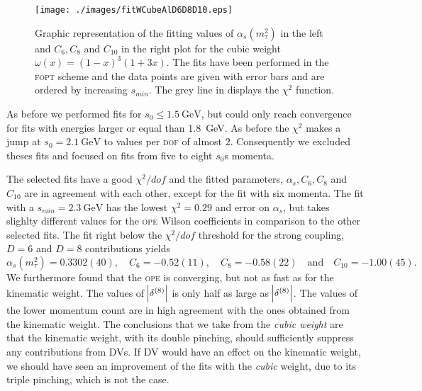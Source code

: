 \documentclass[../../index.tex]{subfiles}
\begin{document}
\begin{figure}
  \centering \texttt{[image: ./images/fitWCubeAlD6D8D10.eps]}
  \caption{Graphic representation of the fitting values of
    \(\alpha_s(m_\tau^2)\) in the left and \(C_6, C_8\) and \(C_{10}\) in the
    right plot for the cubic weight \(\omega(x)=(1-x)^3(1+3x)\). The fits have
    been performed in the \textsc{fopt} scheme and the data points are given
    with error bars and are ordered by increasing \(s_{min}\). The grey line in
    displays the \(\chi^2\) function.}
  \label{fig:fitWCubeAlpha}
\end{figure}

As before we performed fits for \(s_0 \leq \SI{1.5}{\giga\eV}\), but could only
reach convergence for fits with energies larger or equal than
\SI{1.8}{\giga\eV}. As before the \(\chi^2\) makes a jump at
\(s_0=\SI{2.1}{\giga\eV}\) to values per \textsc{dof} of almost \(2\).
Consequently we excluded theses fits and focused on fits from five to eight
\(s_0\)s momenta.

The selected fits have a good \(\chi^2/dof\) and the fitted parameters,
\(\alpha_s, C_6, C_8\) and \(C_{10}\) are in agreement with each other, except
for the fit with six momenta. The fit with a \(s_{min}=\SI{2.3}{\giga\eV}\) has
the lowest \(\chi^2=0.29\) and error on \(\alpha_s\), but takes slighlty
different values for the \textsc{ope} Wilson coefficients in comparison to the
other selected fits. The fit right below the \(\chi^2/dof\) threshold for the
strong coupling, \(D=6\) and \(D=8\) contributions yields
\begin{equation}
  \label{eq:wKinResult}
  \alpha_s(m_\tau^2)=0.3302(40), \quad C_6=-0.52(11), \quad C_8=-0.58(22) \quad \text{and} \quad C_{10}=-1.00(45).
\end{equation}
We furthermore found that the \textsc{ope} is converging, but not as fast as for
the kinematic weight. The values of \(\abs{\delta^{(8)}}\) is only half as large
as \(\abs{\delta^{(8)}}\). The values of the lower momentum count are in high
agreement with the ones obtained from the kinematic weight. The conclusions that
we take from the \textit{cubic weight} are that the kinematic weight, with its
double pinching, should sufficiently suppress any contributions from
\textsc{DV}s. If \textsc{DV} would have an effect on the kinematic weight, we
should have seen an improvement of the fits with the \textit{cubic} weight, due
to its triple pinching, which is not the case.
\end{document}
